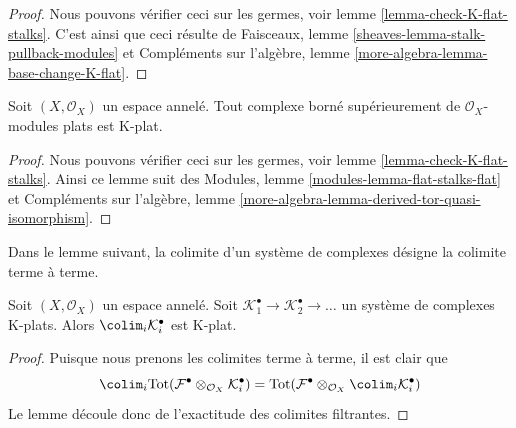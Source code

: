 \begin{proof}
Nous pouvons vérifier ceci sur les germes, voir lemme \ref{lemma-check-K-flat-stalks}. C'est ainsi que ceci résulte de Faisceaux, lemme \ref{sheaves-lemma-stalk-pullback-modules} et Compléments sur l'algèbre, lemme \ref{more-algebra-lemma-base-change-K-flat}.
\end{proof}

\begin{lemma}

\label{lemma-bounded-flat-K-flat}
Soit $(X, \mathcal{O}_X)$ un espace annelé. Tout complexe borné supérieurement de $\mathcal{O}_X$-modules plats est K-plat.
\end{lemma}

\begin{proof}
Nous pouvons vérifier ceci sur les germes, voir lemme \ref{lemma-check-K-flat-stalks}. Ainsi ce lemme suit des Modules, lemme \ref{modules-lemma-flat-stalks-flat} et Compléments sur l'algèbre, lemme \ref{more-algebra-lemma-derived-tor-quasi-isomorphism}.
\end{proof}

\noindent
Dans le lemme suivant, la colimite d'un système de complexes désigne la colimite terme à terme.

\begin{lemma}

\label{lemma-colimit-K-flat}

Soit $(X, \mathcal{O}_X)$ un espace annelé. Soit $\mathcal{K}_1^\bullet \to \mathcal{K}_2^\bullet \to \ldots$
un système de complexes K-plats. Alors $\colim_i \mathcal{K}_i^\bullet$ est K-plat.

\end{lemma}

\begin{proof}

Puisque nous prenons les colimites terme à terme, il est clair que
$$
\colim_i \text{Tot}(
\mathcal{F}^\bullet \otimes_{\mathcal{O}_X} \mathcal{K}_i^\bullet)
=
\text{Tot}(\mathcal{F}^\bullet \otimes_{\mathcal{O}_X}
\colim_i \mathcal{K}_i^\bullet)
$$
Le lemme découle donc de l'exactitude des colimites filtrantes.

\end{proof}

